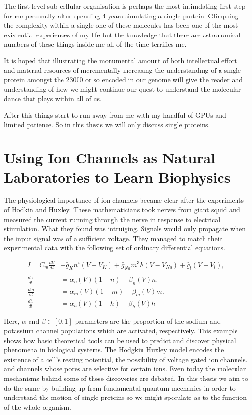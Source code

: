 The first level sub cellular organisation is perhaps the most intimdating first step for me personally after spending 4 years simulating a single protein. Glimpsing the complexity within a single one of these molecules has been one of the most existential experiences of my life but the knowledge that there are astronomical numbers of these things inside me all of the time terrifies me.

It is hoped that illustrating the monumental amount of both intellectual effort and material resources of incrementally increasing the understanding of a single protein amongst the 23000 or so encoded in our genome will give the reader and understanding of how we might continue our quest to understand the molecular dance that plays within all of us.

After this things start to run away from me with my handful of GPUs and limited patience. So in this thesis we will only discuss single proteins.

\section{Using Ion Channels as Natural Laboratories to Learn Biophysics}

The physiological importance of ion channels became clear after the experiments of Hodkin and Huxley. These mathematicians took nerves from giant squid and measured the current running through the nerve in response to electrical stimulation. What they found was intruiging. Signals would only propagate when the input signal was of a sufficient voltage. They managed to match their experimental data with the following set of ordinary differential equations.

\begin{equation}
\begin{aligned}
	I = C_m \frac{dV}{dt} &+ \bar{g}_K n^4 (V - V_K) + \bar{g}_{Na} m^3 h (V - V_{Na} ) + \bar{g}_l (V-V_l) ,  \\ \\
	\frac{dn}{dt} &= \alpha_n(V)  (1-n) - \beta_n(V)  n, \\
	\frac{dm}{dt} &= \alpha_m(V)  (1-m) - \beta_m(V)  m, \\ 
	\frac{dh}{dt} &= \alpha_h(V)  (1-h) - \beta_h(V)  h  
\end{aligned}
\end{equation}

Here, $\alpha$ and $\beta \in [0,1]$ parameters are the proportion of the sodium and potassium channel populations which are activated, respectively.  This example shows how basic theoretical tools can be used to predict and discover physical phenomena in biological systems. The Hodgkin Huxley model encodes the existence of a cell's resting potential, the possibility of voltage gated ion channels, and channels whose pores are selective for certain ions. Even today the molecular mechanisms behind some of these discoveries are debated. In this thesis we aim to do the same by building up from fundamental quantum mechanics in order to understand the motion of single proteins so we might speculate as to the function of the whole organism.

